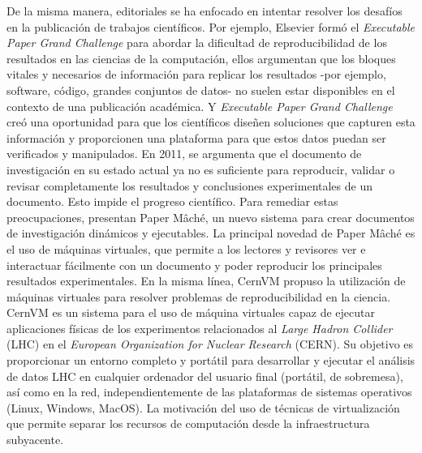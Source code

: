 De la misma manera, editoriales se ha enfocado en intentar resolver los desafíos en la publicación de trabajos científicos. Por ejemplo, Elsevier formó el \textit{Executable Paper Grand Challenge} para abordar la dificultad de reproducibilidad de los resultados en las ciencias de la computación, ellos  argumentan que los bloques vitales y necesarios de información para replicar los resultados -por ejemplo, software, código, grandes conjuntos de datos- no suelen estar disponibles en el contexto de una publicación académica. 
Y \textit{Executable Paper Grand Challenge} creó una oportunidad para que los científicos diseñen soluciones que capturen esta información y proporcionen una plataforma para que estos datos puedan ser verificados y manipulados. 
En 2011, \cite{DBLP:journals/procedia/BrammerCMW11} se argumenta que el documento de investigación en su estado actual ya no es suficiente para reproducir, validar o revisar completamente los resultados y conclusiones experimentales de un documento. Esto impide el progreso científico. 
Para remediar estas preocupaciones, presentan Paper Mâché, un nuevo sistema para crear documentos de investigación dinámicos y ejecutables. La principal novedad de Paper Mâché es el uso de máquinas virtuales, que permite a los lectores y revisores ver e interactuar fácilmente con un documento y poder reproducir los principales resultados experimentales.
En la misma línea, CernVM \cite{buncic2010cernvm} propuso la utilización de máquinas virtuales para resolver problemas de reproducibilidad en la ciencia. CernVM es un sistema para el uso de máquina virtuales capaz de ejecutar aplicaciones físicas de los experimentos relacionados al \textit{Large Hadron Collider} (LHC) en el \textit{European Organization for Nuclear Research} (CERN). Su objetivo es proporcionar un entorno completo y portátil para desarrollar y ejecutar el análisis de datos LHC en cualquier ordenador del usuario final (portátil, de sobremesa), así como en la red, independientemente de las plataformas de sistemas operativos (Linux, Windows, MacOS). La motivación del uso de técnicas de virtualización que permite separar los recursos de computación desde la infraestructura subyacente.


